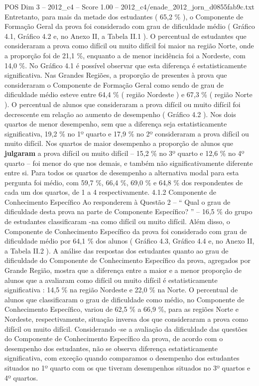 \begin{textsample}{POS Dim 3 – 2012\_c4 – Score 1.00 – 2012\_c4/enade\_2012\_jorn\_d0855fab9c.txt}
Entretanto, para mais da metade dos estudantes ( 65,2 \% ), o Componente de Formação Geral da prova foi considerado com grau de dificuldade médio ( Gráfico 4.1, Gráfico 4.2 e, no Anexo II, a Tabela II.1 ).
O percentual de estudantes que consideraram a prova como difícil ou muito difícil foi maior na região Norte, onde a proporção foi de 21,1 \%, enquanto a de menor incidência foi a Nordeste, com 14,0 \%.
No Gráfico 4.1 é possível observar que esta diferença é estatisticamente significativa.
Nas Grandes Regiões, a proporção de presentes à prova que consideraram o Componente de Formação Geral como sendo de grau de dificuldade médio esteve entre 64,4 \% ( região Nordeste ) e 67,3 \% ( região Norte ).
O percentual de alunos que consideraram a prova difícil ou muito difícil foi decrescente em relação ao aumento de desempenho ( Gráfico 4.2 ).
Nos dois quartos de menor desempenho, sem que a diferença seja estatisticamente significativa, 19,2 \% no 1º quarto e 17,9 \% no 2º consideraram a prova difícil ou muito difícil.
Nos quartos de maior desempenho a proporção de alunos que \textbf{julgaram} a prova difícil ou muito difícil – 15,2 \% no 3º quarto e 12,6 \% no 4º quarto – foi menor do que nos demais, e também não significativamente diferente entre si.
Para todos os quartos de desempenho a alternativa modal para esta pergunta foi médio, com 59,7 \%, 66,4 \%, 69,0 \% e 64,8 \% dos respondentes de cada um dos quartos, de 1 a 4 respectivamente. 4.1.2 Componente de Conhecimento Específico Ao responderem à Questão 2 – “ Qual o grau de dificuldade desta prova na parte de Componente Específico? ” – 16,5 \% do grupo de estudantes classificaram -na como difícil ou muito difícil.
Além disso, o Componente de Conhecimento Específico da prova foi considerado com grau de dificuldade médio por 64,1 \% dos alunos ( Gráfico 4.3, Gráfico 4.4 e, no Anexo II, a Tabela II.2 ).
A análise das respostas dos estudantes quanto ao grau de dificuldade do Componente de Conhecimento Específico da prova, agregados por Grande Região, mostra que a diferença entre a maior e a menor proporção de alunos que a avaliaram como difícil ou muito difícil é estatisticamente significativa : 14,5 \% na região Nordeste e 22,0 \% na Norte.
O percentual de alunos que classificaram o grau de dificuldade como médio, no Componente de Conhecimento Específico, variou de 62,5 \% a 66,9 \%, para as regiões Norte e Nordeste, respectivamente, situação inversa dos que consideraram a prova como difícil ou muito difícil.
Considerando -se a avaliação da dificuldade das questões do Componente de Conhecimento Específico da prova, de acordo com o desempenho dos estudantes, não se observa diferença estatisticamente significativa, com exceção quando comparamos o desempenho dos estudantes situados no 1º quarto com os que tiveram desempenhos situados no 3º quartos e 4º quartos.

\end{textsample}
